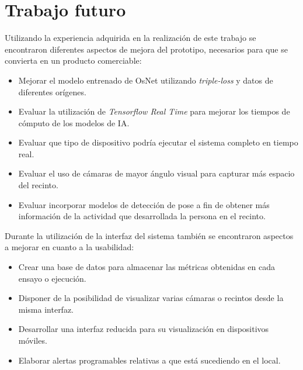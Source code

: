 \section{Trabajo futuro}

Utilizando la experiencia adquirida en la realización de este trabajo se encontraron diferentes aspectos de mejora del prototipo, necesarios para que se convierta en un producto comerciable:

\begin{itemize}
\item Mejorar el modelo entrenado de OsNet utilizando \textit{triple-loss} y datos de diferentes orígenes.
\item Evaluar la utilización de \textit{Tensorflow Real Time} para mejorar los tiempos de cómputo de los modelos de IA.
\item Evaluar que tipo de dispositivo podría ejecutar el sistema completo en tiempo real.
\item Evaluar el uso de cámaras de mayor ángulo visual para capturar más espacio del recinto.
\item Evaluar incorporar modelos de detección de pose a fin de obtener más información de la actividad que desarrollada la persona en el recinto.
\end{itemize}

Durante la utilización de la interfaz del sistema también se encontraron aspectos a mejorar en cuanto a la usabilidad:
\begin{itemize}
\item Crear una base de datos para almacenar las métricas obtenidas en cada ensayo o ejecución.
\item Disponer de la posibilidad de visualizar varias cámaras o recintos desde la misma interfaz.
\item Desarrollar una interfaz reducida para su visualización en dispositivos móviles.
\item Elaborar alertas programables relativas a que está sucediendo en el local.
\end{itemize}
